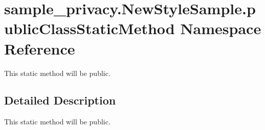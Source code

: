 \hypertarget{namespacesample__privacy_1_1_new_style_sample_1_1public_class_static_method}{\section{sample\-\_\-privacy.\-New\-Style\-Sample.\-public\-Class\-Static\-Method Namespace Reference}
\label{namespacesample__privacy_1_1_new_style_sample_1_1public_class_static_method}
}


This static method will be public.  




\subsection{Detailed Description}
This static method will be public. 